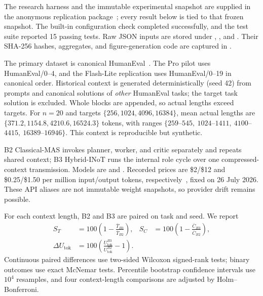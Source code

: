 The research harness and the immutable experimental snapshot are supplied in the anonymous replication package~\cite{inotresearch2026}; every result below is tied to that frozen snapshot. The built-in configuration check completed successfully, and the test suite reported 15 passing tests. Raw JSON inputs are stored under , , and . Their SHA-256 hashes, aggregates, and figure-generation code are captured in .

The primary dataset is canonical HumanEval~\cite{chen2021humaneval}. The Pro pilot uses HumanEval/0--4, and the Flash-Lite replication uses HumanEval/0--19 in canonical order. Historical context is generated deterministically (seed 42) from prompts and canonical solutions of \emph{other} HumanEval tasks; the target task solution is excluded. Whole blocks are appended, so actual lengths exceed targets. For $n=20$ and targets $\{256,1024,4096,16384\}$, mean actual lengths are $\{371.2,1154.8,4210.6,16524.3\}$ tokens, with ranges $\{259$--$545,\ 1024$--$1411,\ 4100$--$4415,\ 16389$--$16946\}$. This context is reproducible but synthetic.

B2 Classical-MAS invokes planner, worker, and critic separately and repeats shared context; B3 Hybrid-INoT runs the internal role cycle over one compressed-context transmission. Models are  and . Recorded prices are \$2/\$12 and \$0.25/\$1.50 per million input/output tokens, respectively~\cite{openrouterpro2026,openrouterflash2026}, fixed on 26 July 2026. These API aliases are not immutable weight snapshots, so provider drift remains possible.

For each context length, B2 and B3 are paired on task and seed. We report
\begin{align}
S_T &= 100\left(1-\frac{\overline{T}_{B3}}{\overline{T}_{B2}}\right), &
S_C &= 100\left(1-\frac{\overline{C}_{B3}}{\overline{C}_{B2}}\right), \label{eq:empirical-savings}\\
\Delta U_{\mathrm{tok}} &= 100\left(\frac{U_{\mathrm{tok}}^{B3}}{U_{\mathrm{tok}}^{B2}}-1\right). \label{eq:empirical-utok}
\end{align}
Continuous paired differences use two-sided Wilcoxon signed-rank tests; binary outcomes use exact McNemar tests. Percentile bootstrap confidence intervals use $10^4$ resamples, and four context-length comparisons are adjusted by Holm--Bonferroni.

